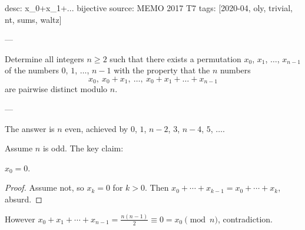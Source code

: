 desc: x_0+x_1+... bijective
source: MEMO 2017 T7
tags: [2020-04, oly, trivial, nt, sums, waltz]

---

Determine all integers $n\ge2$ such that there exists a permutation $x_0$, $x_1$, $\ldots$, $x_{n-1}$ of the numbers $0$, $1$, $\ldots$, $n-1$ with the property that the $n$ numbers \[x_0,\ x_0+x_1,\ \ldots, \ x_0+x_1+\ldots+x_{n-1}\]
are pairwise distinct modulo $n$.

---

The answer is $n$ even, achieved by $0$, $1$, $n-2$, $3$, $n-4$, $5$, $\ldots$.

Assume $n$ is odd. The key claim:
\begin{claim*}
    $x_0=0$.
\end{claim*}
\begin{proof}
    Assume not, so $x_k=0$ for $k>0$. Then $x_0+\cdots+x_{k-1}=x_0+\cdots+x_k$, absurd.
\end{proof}

However $x_0+x_1+\cdots+x_{n-1}=\frac{n(n-1)}2\equiv0=x_0\pmod n$, contradiction.
